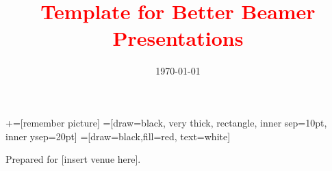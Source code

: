 \documentclass[notes,11pt, aspectratio=169]{beamer}
\title[]{\textcolor{red}{Template for Better Beamer Presentations}}
\author[EAJ]{}
\institute[UMDCP]{\small{\begin{tabular}{c c c}
\multicolumn{3}{c}{Evan A. Jones} \\
\multicolumn{3}{c}{University of Maryland -- College Park}


\end{tabular}}}
\date{\today}
\begin{document}
\newcommand\marktopleft[1]{%
    \tikz[overlay,remember picture] 
        \node (marker-#1-a) at (-.3em,.3em) {};%
}
\newcommand\markbottomright[2]{%
    \tikz[overlay,remember picture] 
        \node (marker-#1-b) at (0em,0em) {};%
}
+=[remember picture] 
 =[draw=black, very thick, rectangle, inner sep=10pt, inner ysep=20pt]
 =[draw=black,fill=red, text=white]

\begin{frame}
\maketitle
  \centering Prepared for [insert venue here].
\end{frame}
\end{document}
